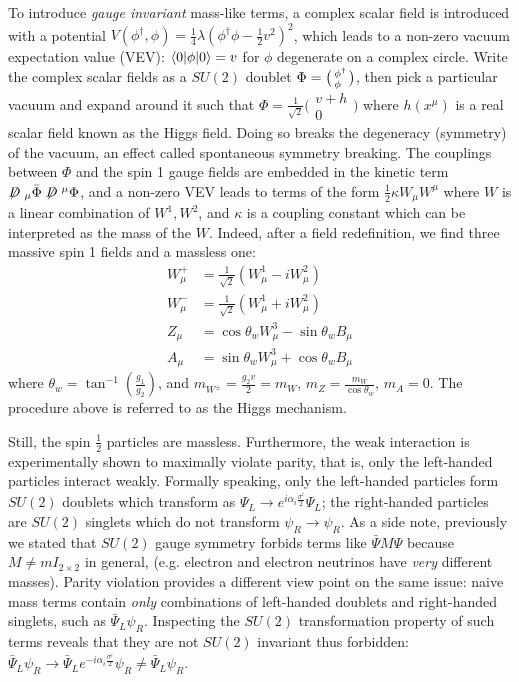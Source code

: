 To introduce \emph{gauge invariant} mass-like terms,
a complex scalar field is introduced with a potential
$V(\phi^\dagger, \phi) = \frac{1}{4}\lambda \left(\phi^\dagger \phi - \frac{1}{2}v^2\right)^2$,
which leads to a non-zero vacuum expectation value (VEV):
$\langle0\rvert\phi\lvert0\rangle = v$ for $\phi$ degenerate on a complex circle.
Write the complex scalar fields as a $SU(2)$ doublet
$\Phi = \bigl(\begin{smallmatrix} \phi^\dagger \\ \phi^{\hphantom{\dagger}} \end{smallmatrix}\bigr)$,
then pick a particular vacuum and expand around it such that
$\Phi = \frac{1}{\sqrt{2}} \bigl(\begin{smallmatrix} v + h \\ 0 \end{smallmatrix}\bigr)$
where $h(x^\mu)$ is a real scalar field known as the Higgs field.
Doing so breaks the degeneracy (symmetry) of the vacuum,
an effect called spontaneous symmetry breaking.
The couplings between $\Phi$ and the spin 1 gauge fields are embedded in the
kinetic term $\fsl{D}_\mu \bar\Phi \fsl{D}^\mu \Phi$,
and a non-zero VEV leads to terms of the form
$\frac{1}{2}\kappa W_\mu W^{\mu}$
where $W$ is a linear combination of $W^1, W^2$,
and $\kappa$ is a coupling constant which can be interpreted as the mass
of the $W$.
Indeed,
after a field redefinition, we find three massive spin 1 fields and a massless
one:
\begin{align}
    W^+_\mu &= \frac{1}{\sqrt{2}}(W^1_\mu - i W^2_\mu) \\
    W^-_\mu &= \frac{1}{\sqrt{2}}(W^1_\mu + i W^2_\mu) \\
    Z_\mu &= \cos\theta_w W^3_\mu - \sin\theta_w B_\mu \\
    A_\mu &= \sin\theta_w W^3_\mu + \cos\theta_w B_\mu
\end{align}
where $\theta_w = \tan^{-1}\left(\frac{g_1}{g_2}\right)$,
and $m_{W^\pm} = \frac{g_2 v}{2} = m_W$, $m_Z = \frac{m_W}{\cos\theta_w}$,
$m_A = 0$.
The procedure above is referred to as the Higgs mechanism.

Still, the spin $\frac{1}{2}$ particles are massless.
Furthermore, the weak interaction is experimentally shown to maximally violate
parity,
that is, only the left-handed particles interact weakly.
Formally speaking, only the left-handed particles form $SU(2)$ doublets
which transform as
$\Psi_L \rightarrow e^{i \alpha_i \frac{\sigma^i}{2}} \Psi_L$;
the right-handed particles are $SU(2)$ singlets which do not transform
$\psi_R \rightarrow \psi_R$.
As a side note, previously we stated that $SU(2)$ gauge symmetry forbids
terms like $\bar{\Psi} M \Psi$ because $M \neq m I_{2 \times 2}$ in
general,
(e.g. electron and electron neutrinos have \emph{very} different masses).
Parity violation provides a different view point on the same issue:
naive mass terms contain \emph{only} combinations of left-handed doublets
and right-handed singlets, such as $\bar{\Psi}_L \psi_R$.
Inspecting the $SU(2)$ transformation property of such terms reveals that
they are not $SU(2)$ invariant thus forbidden:
$\bar{\Psi}_L \psi_R \rightarrow \bar{\Psi}_L e^{-i \alpha_i \frac{\sigma^i}{2}} \psi_R \neq \bar{\Psi}_L \psi_R$.

